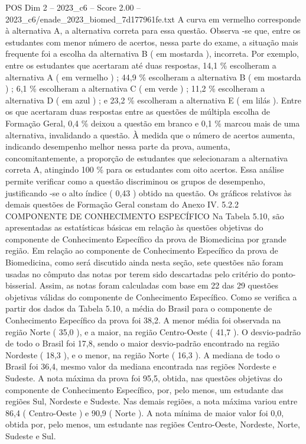 \begin{textsample}{POS Dim 2 – 2023\_c6 – Score 2.00 – 2023\_c6/enade\_2023\_biomed\_7d177961fe.txt}
A curva em vermelho corresponde à alternativa A, a alternativa correta para essa questão.
Observa -se que, entre os estudantes com menor número de acertos, nessa parte do exame, a situação mais frequente foi a escolha da alternativa B ( em mostarda ), incorreta.
Por exemplo, entre os estudantes que acertaram até duas respostas, 14,1 \% escolheram a alternativa A ( em vermelho ) ; 44,9 \% escolheram a alternativa B ( em mostarda ) ; 6,1 \% escolheram a alternativa C ( em verde ) ; 11,2 \% escolheram a alternativa D ( em azul ) ; e 23,2 \% escolheram a alternativa E ( em lilás ).
Entre os que acertaram duas respostas entre as questões de múltipla escolha de Formação Geral, 0,4 \% deixou a questão em branco e 0,1 \% marcou mais de uma alternativa, invalidando a questão.
À medida que o número de acertos aumenta, indicando desempenho melhor nessa parte da prova, aumenta, concomitantemente, a proporção de estudantes que selecionaram a alternativa correta A, atingindo 100 \% para os estudantes com oito acertos.
Essa análise permite verificar como a questão discriminou os grupos de desempenho, justificando -se o alto índice ( 0,43 ) obtido na questão.
Os gráficos relativos às demais questões de Formação Geral constam do Anexo IV. 5.2.2 COMPONENTE DE CONHECIMENTO ESPECÍFICO Na Tabela 5.10, são apresentadas as estatísticas básicas em relação às questões objetivas do componente de Conhecimento Específico da prova de Biomedicina por grande região.
Em relação ao componente de Conhecimento Específico da prova de Biomedicina, como será discutido ainda nesta seção, sete questões não foram usadas no cômputo das notas por terem sido descartadas pelo critério do ponto-bisserial.
Assim, as notas foram calculadas com base em 22 das 29 questões objetivas válidas do componente de Conhecimento Específico.
Como se verifica a partir dos dados da Tabela 5.10, a média do Brasil para o componente de Conhecimento Específico da prova foi 38,2.
A menor média foi observada na região Norte ( 35,0 ), e a maior, na região Centro-Oeste ( 41,7 ).
O desvio-padrão de todo o Brasil foi 17,8, sendo o maior desvio-padrão encontrado na região Nordeste ( 18,3 ), e o menor, na região Norte ( 16,3 ).
A mediana de todo o Brasil foi 36,4, mesmo valor da mediana encontrada nas regiões Nordeste e Sudeste.
A nota máxima da prova foi 95,5, obtida, nas questões objetivas do componente de Conhecimento Específico, por, pelo menos, um estudante das regiões Sul, Nordeste e Sudeste.
Nas demais regiões, a nota máxima variou entre 86,4 ( Centro-Oeste ) e 90,9 ( Norte ).
A nota mínima de maior valor foi 0,0, obtida por, pelo menos, um estudante nas regiões Centro-Oeste, Nordeste, Norte, Sudeste e Sul.

\end{textsample}
